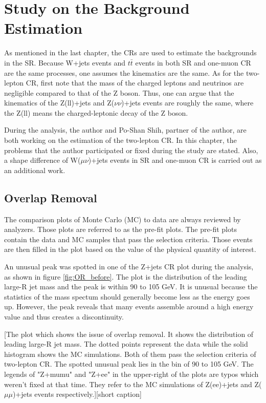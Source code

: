 \documentclass[class=NCU_thesis, crop=false]{standalone}
\begin{document}
\chapter{Study on the Background Estimation}
	As mentioned in the last chapter, the CRs are used to estimate the backgrounds in the SR. Because W+jets events and $t\bar{t}$ events in both SR and one-muon CR are the same processes, one assumes the kinematics are the same. As for the two-lepton CR, first note that the mass of the charged leptons and neutrinos are negligible compared to that of the Z boson. Thus, one can argue that the kinematics of the Z(ll)+jets and Z($\nu \nu$)+jets events are roughly the same, where the Z(ll) means the charged-leptonic decay of the Z boson.
	
	During the analysis, the author and Po-Shan Shih, partner of the author, are both working on the estimation of the two-lepton CR. In this chapter, the problems that the author participated or fixed during the study are stated. Also, a shape difference of W($\mu \nu$)+jets events in SR and one-muon CR is carried out as an additional work.
	
	\section{Overlap Removal}
		The comparison plots of Monte Carlo (MC) to data are always reviewed by analyzers. Those plots are referred to as the pre-fit plots. The pre-fit plots contain the data and MC samples that pass the selection criteria. Those events are then filled in the plot based on the value of the physical quantity of interest.
		
		An unusual peak was spotted in one of the Z+jets CR plot during the analysis, as shown in figure \ref{fig:OR_before}. The plot is the distribution of the leading large-R jet mass and the peak is within 90 to 105 GeV. It is unusual because the statistics of the mass spectum should generally become less as the energy goes up. However, the peak reveals that many events assemble around a high energy value and thus creates a discontinuity.
		
		[The plot which shows the issue of overlap removal. It shows the distribution of leading large-R jet mass. The dotted points represent the data while the solid histogram shows the MC simulations. Both of them pass the selection criteria of two-lepton CR. The spotted unusual peak lies in the bin of 90 to 105 GeV. The legends of "Z+mumu" and "Z+ee" in the upper-right of the plots are typos which weren't fixed at that time. They refer to the MC simulations of Z(ee)+jets and Z($\mu \mu$)+jets events respectively.][short caption]
		
\end{document}
